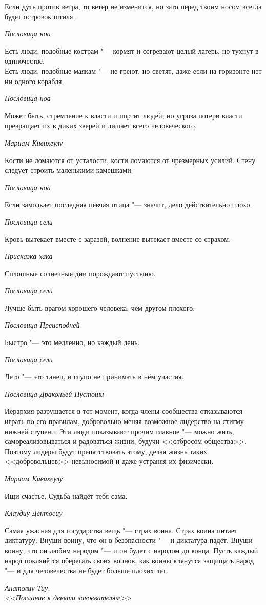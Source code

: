 \documentclass[a4paper,10pt]{book}
\begin{document}
\epigraph{Если дуть против ветра, то ветер не изменится, но зато перед твоим носом всегда будет островок штиля.}
{\textit{Пословица ноа}}

\epigraph{Есть люди, подобные кострам "--- кормят и согревают целый лагерь, но тухнут в одиночестве.\\
Есть люди, подобные маякам "--- не греют, но светят, даже если на горизонте нет ни одного корабля.}
{\textit{Пословица ноа}}

\epigraph{Может быть, стремление к власти и портит людей, но угроза потери власти превращает их в диких зверей и лишает всего человеческого.}
{\textit{Мариам Кивихеулу}}

\epigraph{Кости не ломаются от усталости, кости ломаются от чрезмерных усилий. Стену следует строить маленькими камешками.}
{\textit{Пословица ноа}}

\epigraph{Если замолкает последняя певчая птица "--- значит, дело действительно плохо.}
{\textit{Пословица сели}}

\epigraph{Кровь вытекает вместе с заразой, волнение вытекает вместе со страхом.}
{\textit{Присказка хака}}

\epigraph{Сплошные солнечные дни порождают пустыню.}
{\textit{Пословица сели}}

\epigraph{Лучше быть врагом хорошего человека, чем другом плохого.}
{\textit{Пословица Преисподней}}

\epigraph{Быстро "--- это медленно, но каждый день.}
{\textit{Пословица сели}}

\epigraph{Лето "--- это танец, и глупо не принимать в нём участия.}
{\textit{Пословица Драконьей Пустоши}}

\epigraph{Иерархия разрушается в тот момент, когда члены сообщества отказываются играть по его правилам, добровольно меняя возможное лидерство на стигму нижней ступени. Эти люди показывают прочим главное "--- можно жить, самореализовываться и радоваться жизни, будучи <<отбросом общества>>. Поэтому лидеры будут препятствовать этому, делая жизнь таких <<добровольцев>> невыносимой и даже устраняя их физически.}
{\textit{Мариам Кивихеулу}}

\epigraph{Ищи счастье. Судьба найдёт тебя сама.}
{\textit{Клаудиу Дентосиу}}

\epigraph{Самая ужасная для государства вещь "--- страх воина.
Страх воина питает диктатуру.
Внуши воину, что он в безопасности "--- и диктатура падёт.
Внуши воину, что он любим народом "--- и он будет с народом до конца.
Пусть каждый народ поклянётся оберегать своих воинов, как воины клянутся защищать народ "--- и для человечества не будет больше плохих лет.}
{\textit{Анатолиу Тиу.\\<<Послание к девяти завоевателям>>}}
\end{document}
